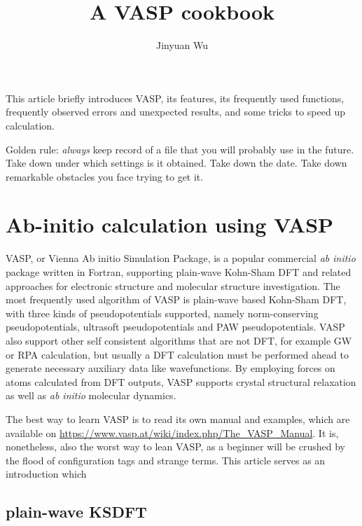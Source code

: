 \documentclass[hyperref, a4paper]{article}
\title{A VASP cookbook}
\author{Jinyuan Wu}
\begin{document}
\maketitle

This article briefly introduces VASP, its features, its frequently used functions, frequently observed errors and unexpected results, and some tricks to speed up calculation.

Golden rule: \emph{always} keep record of a file that you will probably use in the future. 
Take down under which settings is it obtained. Take down the date. Take down remarkable obstacles you face trying to get it.

\section{Ab-initio calculation using VASP}

VASP, or Vienna Ab initio Simulation Package, is a popular commercial \emph{ab initio} package written in Fortran, supporting plain-wave Kohn-Sham DFT and related approaches for electronic structure and molecular structure investigation.
The most frequently used algorithm of VASP is plain-wave based Kohn-Sham DFT, with three kinds of pseudopotentials supported,
namely norm-conserving pseudopotentials, ultrasoft pseudopotentials and PAW pseudopotentials.
VASP also support other self consistent algorithms that are not DFT, for example GW or RPA calculation, but usually a DFT calculation must be performed ahead to generate necessary auxiliary data like wavefunctions.
By employing forces on atoms calculated from DFT outputs, VASP supports crystal structural relaxation as well as \emph{ab initio} molecular dynamics.

The best way to learn VASP is to read its own manual and examples, which are available on \url{https://www.vasp.at/wiki/index.php/The_VASP_Manual}.
It is, nonetheless, also the worst way to lean VASP, as a beginner will be crushed by the flood of configuration tags and strange terms.
This article serves as an introduction which 

\subsection{plain-wave KSDFT}
\end{document}
